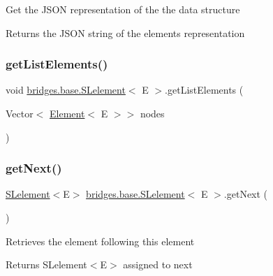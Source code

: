 Get the J\+S\+ON representation of the the data structure

\begin{DoxyReturn}{Returns}
the J\+S\+ON string of the element\textquotesingle{}s representation 
\end{DoxyReturn}
\mbox{\label{classbridges_1_1base_1_1_s_lelement_abadffea339171349a8e86ded9cd3fe21}} 
\subsubsection{\texorpdfstring{get\+List\+Elements()}{getListElements()}}
{\footnotesize\ttfamily void \hyperlink{classbridges_1_1base_1_1_s_lelement}{bridges.\+base.\+S\+Lelement}$<$ E $>$.get\+List\+Elements (\begin{DoxyParamCaption}\item[{Vector$<$ \hyperlink{classbridges_1_1base_1_1_element}{Element}$<$ E $>$$>$}]{nodes }\end{DoxyParamCaption})\hspace{0.3cm}{\ttfamily [protected]}}

\mbox{\label{classbridges_1_1base_1_1_s_lelement_a060c4671e05e3f20b16630343393b80d}} 
\subsubsection{\texorpdfstring{get\+Next()}{getNext()}}
{\footnotesize\ttfamily \hyperlink{classbridges_1_1base_1_1_s_lelement}{S\+Lelement}$<$E$>$ \hyperlink{classbridges_1_1base_1_1_s_lelement}{bridges.\+base.\+S\+Lelement}$<$ E $>$.get\+Next (\begin{DoxyParamCaption}{ }\end{DoxyParamCaption})}

Retrieves the element following this element

\begin{DoxyReturn}{Returns}
S\+Lelement$<$\+E$>$ assigned to next 
\end{DoxyReturn}
\mbox{\label{classbridges_1_1base_1_1_s_lelement_ab93c03af9d847d32e126d102c18aad9d}} 
